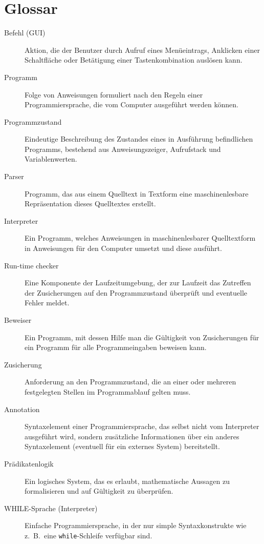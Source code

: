 \section{Glossar}


\begin{description}
    \item[Befehl (GUI)] Aktion, die der Benutzer durch Aufruf eines Menüeintrags, Anklicken einer Schaltfläche oder Betätigung einer Tastenkombination auslösen kann.
    \item[Programm] Folge von Anweisungen formuliert nach den Regeln einer Programmiersprache, die vom Computer ausgeführt werden können.
    \item[Programmzustand] Eindeutige Beschreibung des Zustandes eines in Ausführung befindlichen Programms, bestehend aus Anweisungszeiger, Aufrufstack und Variablenwerten.
    \item[Parser] Programm, das aus einem Quelltext in Textform eine maschinenlesbare Repräsentation dieses Quelltextes erstellt.
    \item[Interpreter] Ein Programm, welches Anweisungen in maschinenlesbarer Quelltextform in Anweisungen für den Computer umsetzt und diese ausführt.
    \item[Run-time checker] Eine Komponente der Laufzeitumgebung, der zur Laufzeit das Zutreffen der Zusicherungen auf den Programmzustand überprüft und eventuelle Fehler meldet.
    \item[Beweiser] Ein Programm, mit dessen Hilfe man die Gültigkeit von Zusicherungen für ein Programm für alle Programmeingaben beweisen kann.
    \item[Zusicherung] Anforderung an den Programmzustand, die an einer oder mehreren festgelegten Stellen im Programmablauf gelten muss.
    \item[Annotation] Syntaxelement einer Programmiersprache, das selbst nicht vom Interpreter ausgeführt wird, sondern zusätzliche Informationen über ein anderes Syntaxelement (eventuell für ein externes System) bereitstellt.
    \item[Prädikatenlogik] Ein logisches System, das es erlaubt, mathematische Aussagen zu formalisieren und auf Gültigkeit zu überprüfen. %
    \item[WHILE-Sprache (Interpreter)] Einfache Programmiersprache, in der nur simple Syntaxkonstrukte wie z.~B.\ eine \texttt{while}-Schleife verfügbar sind.

\end{description}
